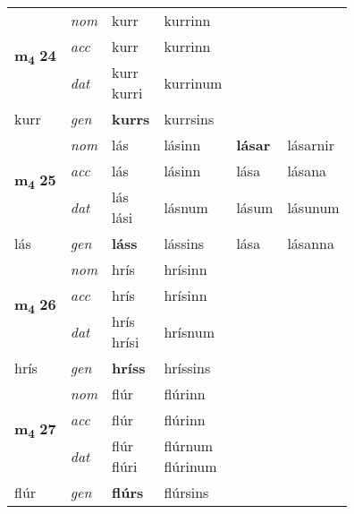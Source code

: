 \begin{longtable}[l]{llllll}
\multirow{3}{*}{{{\textbf{m{\textsubscript{4}}} \Large{\textbf{24}}}}}  & {\footnotesize{{\textit{nom}}}} & kurr & kurrinn    & \textbf{} &   \\*
 &  {\footnotesize{{\textit{acc}}}} & kurr  & kurrinn   &   &  \\*
 &  {\footnotesize{{\textit{dat}}}} & \specialcell{kurr\\ kurri} & kurrinum   &  &  \\*
 {\footnotesize{kurr}} &   {\footnotesize{{\textit{gen}}}} & \textbf{kurrs}  & kurrsins  &  &  \\
\cmidrule{1-6}


\multirow{3}{*}{{{\textbf{m{\textsubscript{4}}} \Large{\textbf{25}}}}}  & {\footnotesize{{\textit{nom}}}} & lás & lásinn    & \textbf{lásar} & lásarnir  \\*
 &  {\footnotesize{{\textit{acc}}}} & lás  & lásinn   & lása  & lásana \\*
 &  {\footnotesize{{\textit{dat}}}} & \specialcell{lás\\ lási} & lásnum   & lásum & lásunum \\*
 {\footnotesize{lás}} &   {\footnotesize{{\textit{gen}}}} & \textbf{láss}  & lássins  & lása & lásanna \\
\cmidrule{1-6}


\multirow{3}{*}{{{\textbf{m{\textsubscript{4}}} \Large{\textbf{26}}}}}  & {\footnotesize{{\textit{nom}}}} & hrís & hrísinn    & \textbf{} &   \\*
 &  {\footnotesize{{\textit{acc}}}} & hrís  & hrísinn   &   &  \\*
 &  {\footnotesize{{\textit{dat}}}} & \specialcell{hrís\\ hrísi} & hrísnum   &  &  \\*
 {\footnotesize{hrís}} &   {\footnotesize{{\textit{gen}}}} & \textbf{hríss}  & hríssins  &  &  \\
\cmidrule{1-6}


\multirow{3}{*}{{{\textbf{m{\textsubscript{4}}} \Large{\textbf{27}}}}}  & {\footnotesize{{\textit{nom}}}} & flúr & flúrinn    & \textbf{} &   \\*
 &  {\footnotesize{{\textit{acc}}}} & flúr  & flúrinn   &   &  \\*
 &  {\footnotesize{{\textit{dat}}}} & \specialcell{flúr\\ flúri} & \specialcell{flúrnum\\ flúrinum}   &  &  \\*
 {\footnotesize{flúr}} &   {\footnotesize{{\textit{gen}}}} & \textbf{flúrs}  & flúrsins  &  &  \\
\cmidrule{1-6}



\end{longtable}
